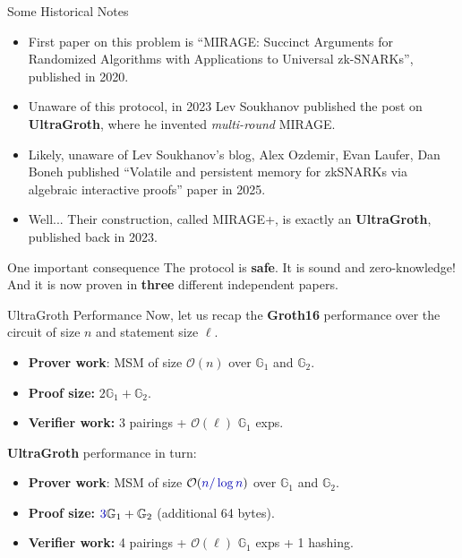 \documentclass{zkdl-presentation-template}
\begin{document}
\begin{frame}{Some Historical Notes}
    \begin{itemize}
        \item First paper on this problem is
        \textcolor{green!70!black}{``\textsf{MIRAGE}: Succinct Arguments for
        Randomized Algorithms with Applications to Universal zk-SNARKs''},
        published in \textcolor{blue!70!black}{2020}.
        \item Unaware of this protocol, in \textcolor{blue!70!black}{2023} Lev
        Soukhanov published the post on
        \textcolor{green!70!black}{\textbf{UltraGroth}}, where he invented
        \textit{multi-round} MIRAGE.
        \item Likely, unaware of Lev Soukhanov's blog, Alex Ozdemir, Evan
        Laufer, Dan Boneh published \textcolor{green!70!black}{``Volatile and
        persistent memory for zkSNARKs via algebraic interactive proofs''} paper
        in \textcolor{blue!70!black}{2025}.
        \item Well... Their construction, called MIRAGE+, is exactly an
        \textcolor{green!70!black}{\textbf{UltraGroth}}, published back in 2023.
    \end{itemize}

    \begin{block}{One important consequence}
        The protocol is \textbf{safe}. It is sound and zero-knowledge! And it is
        now proven in \textbf{three} different independent papers.
    \end{block}
\end{frame}

\begin{frame}{UltraGroth Performance}
    Now, let us recap the \textcolor{green!70!black}{\textbf{Groth16} performance} over
    the circuit of size $n$ and statement size $\ell$.
    \begin{itemize}
        \item \textbf{Prover work}: MSM of size $\mathcal{O}(n)$ over
        $\mathbb{G}_1$ and $\mathbb{G}_2$.
        \item \textbf{Proof size:} $2\mathbb{G}_1+\mathbb{G}_2$.
        \item \textbf{Verifier work:} 3 pairings + $\mathcal{O}(\ell)$
        $\mathbb{G}_1$ exps.
    \end{itemize}

    \textcolor{blue!70!black}{\textbf{UltraGroth} performance} in turn:
    \begin{itemize}
        \item \textbf{Prover work}: MSM of size
        $\mathcal{O}(\textcolor{blue!70!black}{n/\log n})$ over $\mathbb{G}_1$
        and $\mathbb{G}_2$.
        \item \textbf{Proof size:}
        $\textcolor{blue!70!black}{3}\mathbb{G}_1+\mathbb{G}_2$ (additional 64
        bytes).
        \item \textbf{Verifier work:} \textcolor{blue!70!black}{4} pairings +
        $\mathcal{O}(\ell)$ $\mathbb{G}_1$ exps + \textcolor{blue!70!black}{1
        hashing}.
    \end{itemize}
\end{frame}
\end{document}

